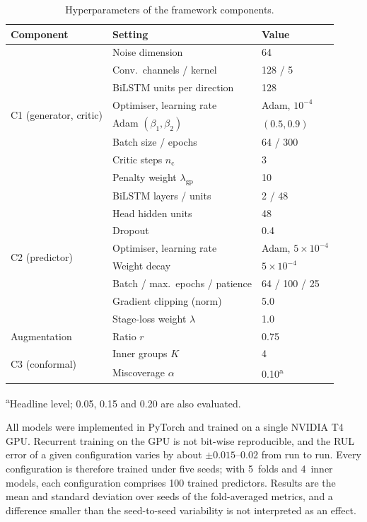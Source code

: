 \begin{table}[htbp]
\centering
\caption{Hyperparameters of the framework components.}
\label{tab:hyperparams}
\footnotesize
\renewcommand{\arraystretch}{1.15}
\begin{tabular}{lll}
\toprule
\textbf{Component} & \textbf{Setting} & \textbf{Value} \\
\midrule
\multirow{8}{*}{C1 (generator, critic)}
 & Noise dimension & 64 \\
 & Conv.\ channels / kernel & 128 / 5 \\
 & BiLSTM units per direction & 128 \\
 & Optimiser, learning rate & Adam, $10^{-4}$ \\
 & Adam $(\beta_1, \beta_2)$ & $(0.5, 0.9)$ \\
 & Batch size / epochs & 64 / 300 \\
 & Critic steps $n_{\mathrm{c}}$ & 3 \\
 & Penalty weight $\lambda_{\mathrm{gp}}$ & 10 \\
\midrule
\multirow{8}{*}{C2 (predictor)}
 & BiLSTM layers / units & 2 / 48 \\
 & Head hidden units & 48 \\
 & Dropout & 0.4 \\
 & Optimiser, learning rate & Adam, $5 \times 10^{-4}$ \\
 & Weight decay & $5 \times 10^{-4}$ \\
 & Batch / max.\ epochs / patience & 64 / 100 / 25 \\
 & Gradient clipping (norm) & 5.0 \\
 & Stage-loss weight $\lambda$ & 1.0 \\
\midrule
Augmentation & Ratio $r$ & 0.75 \\
\multirow{2}{*}{C3 (conformal)} & Inner groups $K$ & 4 \\
 & Miscoverage $\alpha$ & 0.10\textsuperscript{a} \\
\bottomrule
\end{tabular}

\vspace{2pt}
\raggedright\scriptsize \textsuperscript{a}Headline level; 0.05, 0.15
and 0.20 are also evaluated.
\end{table}

All models were implemented in PyTorch and trained on a single NVIDIA
T4 GPU. Recurrent training on the GPU is not bit-wise reproducible, and
the RUL error of a given configuration varies by about
$\pm 0.015$--$0.02$ from run to run. Every configuration is therefore
trained under five seeds; with 5~folds and 4~inner models, each
configuration comprises 100 trained predictors. Results are the mean
and standard deviation over seeds of the fold-averaged metrics, and a
difference smaller than the seed-to-seed variability is not interpreted
as an effect.

